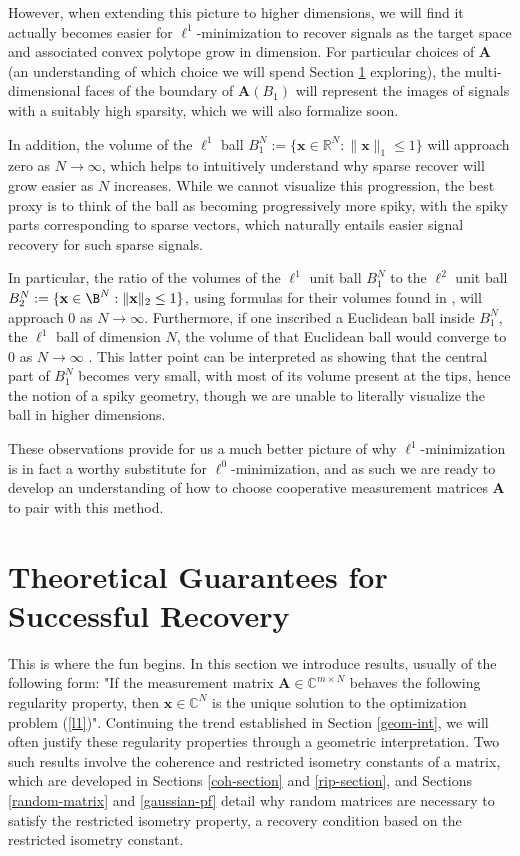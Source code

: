 \documentclass[12pt,a4paper]{amsart}
\numberwithin{equation}{section}
\theoremstyle{plain}
\theoremstyle{definition}
\newcommand{\BR}{\mathbb R}
\newcommand{\BC}{\mathbb C}
\newcommand{\bdx}{\mathbf{x}}
\newcommand{\bdA}{\mathbf{A}}
\begin{document}
However, when extending this picture to higher dimensions, we will find it actually becomes easier for $\ell^1$-minimization to recover signals as the target space and associated convex polytope grow in dimension. For particular choices of $\bdA$ (an understanding of which choice we will spend Section \ref{theory} exploring), the multi-dimensional faces of the boundary of $\bdA(B_1)$ will represent the images of signals with a suitably high sparsity, which we will also formalize soon. 

In addition, the volume of the $\ell^1$ ball $B_1^N:=\{\bdx\in\BR^N:\|\bdx\|_1\leq1\}$ will approach zero as $N\rightarrow\infty$, which helps to intuitively understand why sparse recover will grow easier as $N$ increases. While we cannot visualize this progression, the best proxy is to think of the ball as becoming progressively more spiky, with the spiky parts corresponding to sparse vectors, which naturally entails easier signal recovery for such sparse signals.

In particular, the ratio of the volumes of the $\ell^1$ unit ball $B_1^N$ to the $\ell^2$ unit ball $B_2^N:=\{\bdx\in\B^N:\|\bdx\|_2\leq1\}$, using formulas for their volumes found in \cite{wang}, will approach 0 as $N\rightarrow\infty$. Furthermore, if one inscribed a Euclidean ball inside $B_1^N$, the $\ell^1$ ball of dimension $N$, the volume of that Euclidean ball would converge to 0 as $N\rightarrow\infty$ \cite{vershynin}. This latter point can be interpreted as showing that the central part of $B_1^N$ becomes very small, with most of its volume present at the tips, hence the notion of a spiky geometry, though we are unable to literally visualize the ball in higher dimensions.

These observations provide for us a much better picture of why $\ell^1$-minimization is in fact a worthy substitute for $\ell^0$-minimization, and as such we are ready to develop an understanding of how to choose cooperative measurement matrices $\bdA$ to pair with this method.

\section{Theoretical Guarantees for Successful Recovery}\label{theory}

This is where the fun begins. In this section we introduce results, usually of the following form: "If the measurement matrix $\bdA\in\BC^{m\times N}$ behaves the following regularity property, then $\bdx\in\BC^N$ is the unique solution to the optimization problem (\ref{l1})". Continuing the trend established in Section \ref{geom-int}, we will often justify these regularity properties through a geometric interpretation. Two such results involve the coherence and restricted isometry constants of a matrix, which are developed in Sections \ref{coh-section} and \ref{rip-section}, and Sections \ref{random-matrix} and \ref{gaussian-pf} detail why random matrices are necessary to satisfy the restricted isometry property, a recovery condition based on the restricted isometry constant.
\end{document}
